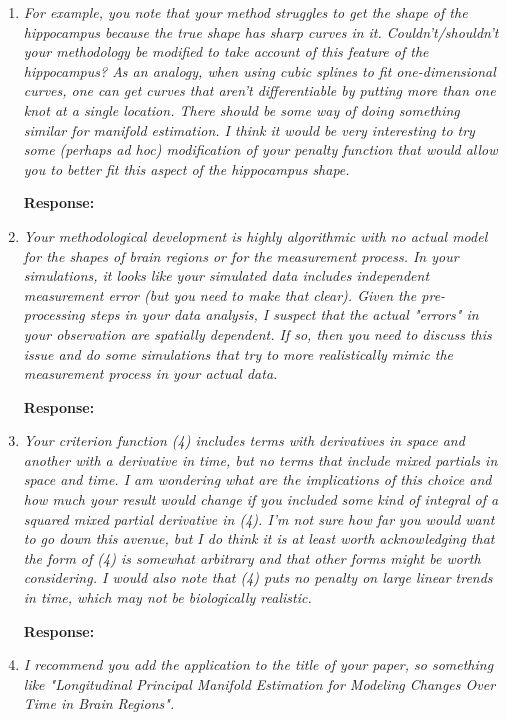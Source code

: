 \documentclass{article}
\theoremstyle{definition}
\begin{document}
\begin{enumerate}

\item {\it For example, you note that your method struggles to get the shape of the hippocampus because the true shape has sharp curves in it.  Couldn't/shouldn't your methodology be modified to take account of this feature of the hippocampus?  As an analogy, when using cubic splines to fit one-dimensional curves, one can get curves that aren't differentiable by putting more than one knot at a single location.  There should be some way of doing something similar for manifold estimation.  I think it would be very interesting to try some (perhaps ad hoc) modification of your penalty function that would allow you to better fit this aspect of the hippocampus shape.}

{\bf Response:}

\item {\it Your methodological development is highly algorithmic with no actual model for the shapes of brain regions or for the measurement process.  In your simulations, it looks like your simulated data includes independent measurement error (but you need to make that clear).  Given the pre-processing steps in your data analysis, I suspect that the actual "errors" in your observation are spatially dependent.  If so, then you need to discuss this issue and do some simulations that try to more realistically mimic the measurement process in your actual data.}

{\bf Response:}


\item {\it Your criterion function (4) includes terms with derivatives in space and another with a derivative in time, but no terms that include mixed partials in space and time.  I am wondering what are the implications of this choice and how much your result would change if you included some kind of integral of a squared mixed partial derivative in (4).  I'm not sure how far you would want to go down this avenue, but I do think it is at least worth acknowledging that the form of (4) is somewhat arbitrary and that other forms might be worth considering.  I would also note that (4) puts no penalty on large linear trends in time, which may not be biologically realistic.}

{\bf Response:}


\item {\it I recommend you add the application to the title of your paper, so something like "Longitudinal Principal Manifold Estimation for Modeling Changes Over Time in Brain Regions".}


\end{enumerate}
\end{document}
